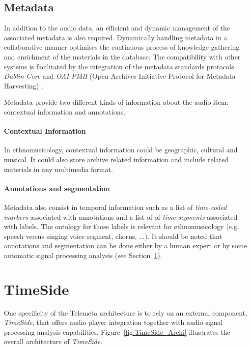 \documentclass{aes53i}
\begin{document}
\subsection{Metadata}\label{sec:metadata}
In addition to the audio data, an efficient and dynamic management of the associated metadata is also required. %
Dynamically handling metadata in a collaborative manner optimises the continuous process of knowledge gathering and enrichment of the materials in the database.  
The compatibility with other systems is facilitated by the integration of the metadata standards protocols \emph{Dublin Core} and \emph{OAI-PMH} (Open Archives Initiative Protocol for Metadata Harvesting) \cite{DublinCore,OAI-PMH}.

Metadata provide two different kinds of information about the audio item: contextual information and annotations.

\paragraph{Contextual Information}
In ethnomusicology, contextual information could be geographic, cultural and musical. It could also store archive related information and include related materials in any multimedia format.

\paragraph{Annotations and segmentation}
Metadata also consist in temporal information such as a list of \emph{time-coded markers} associated with annotations and a list of of \emph{time-segments} associated with labels. The ontology for those labels is relevant for ethnomusicology (e.g. speech versus singing voice segment, chorus, ...).
It should be noted that annotations and segmentation can be done either by a human expert or by some automatic signal processing analysis (see Section~\ref{sec:Timeside}).


\section{TimeSide}\label{sec:Timeside}
One specificity of the Telemeta architecture is to rely on an external component, \emph{TimeSide}, that offers audio player integration together with audio signal processing analysis capabilities. Figure~\ref{fig:TimeSide_Archi} illustrates the overall architecture of \emph{TimeSide}.
\end{document}
